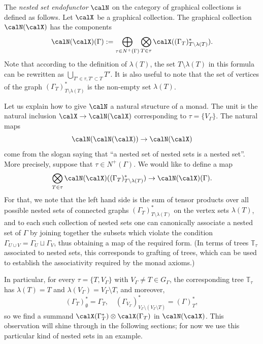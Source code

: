 \begin{defi}
The \emph{nested set endofunctor} $\calN$ on the category of graphical collections is defined as follows. Let $\calX$ be a graphical collection. The graphical collection $\calN(\calX)$ has the components
 \[
\calN(\calX)(\Gamma):=\bigoplus_{\tau\in N^+(\Gamma)}\bigotimes_{T\in \tau}\calX((\Gamma_T)^*_{T\setminus\lambda(T)}).
 \] 
Note that according to the definition of $\lambda(T)$, the set $T\setminus\lambda(T)$ in this formula can be rewritten as $\bigcup_{T'\in \tau, T'\subset T} T'$. It is also useful to note that the set of vertices of the graph $(\Gamma_T)^*_{T\setminus\lambda(T)}$ is the non-empty set $\lambda(T)$.
\end{defi}

Let us explain how to give $\calN$ a natural structure of a monad. The unit is the natural inclusion $\calX\to\calN(\calX)$ corresponding to $\tau=\{V_\Gamma\}$. The natural maps
 \[
\calN(\calN(\calX))\to\calN(\calX)
 \]
come from the slogan saying that ``a nested set of nested sets is a nested set''. More precisely, suppose that $\tau\in N^+(\Gamma)$. We would like to define a map 
 \[
\bigotimes_{T\in \tau}\calN(\calX)((\Gamma_T)^*_{T\setminus\lambda(T)})\to \calN(\calX)(\Gamma). 
 \]
For that, we note that the left hand side is the sum of tensor products over all possible nested sets of connected graphs $(\Gamma_T)^*_{T\setminus\lambda(T)}$ on the vertex sets $\lambda(T)$, and to each such collection of nested sets one can canonically associate a nested set of $\Gamma$ by joining together the subsets which violate the condition $\Gamma_{U\cup V}=\Gamma_U\sqcup\Gamma_V$, thus obtaining a map of the required form. (In terms of trees $\mathbb{T}_\tau$ associated to nested sets, this corresponds to grafting of trees, which can be used to establish the associativity required by the monad axioms.)

In particular, for every $\tau=\{T,V_\Gamma\}$ with $V_\Gamma\ne T\in G_\Gamma$, the corresponding tree $\mathbb{T}_\tau$ has $\lambda(T)=T$ and $\lambda(V_\Gamma)=V_\Gamma\setminus T$, and moreover,
 \[
(\Gamma_T)^*_{\emptyset}=\Gamma_T, \quad (\Gamma_{V_\Gamma})^*_{V_\Gamma\setminus (V_\Gamma\setminus T)}=(\Gamma)^*_T,
 \]
so we find a summand $\calX(\Gamma^*_T)\otimes\calX(\Gamma_T)$ in $\calN(\calX)$. This observation will shine through in the following sections; for now we use this particular kind of nested sets in an example.

